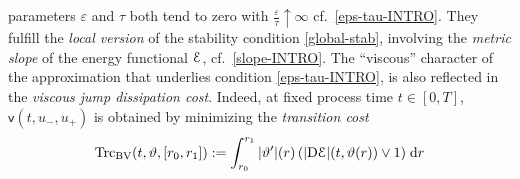 \documentclass[a4paper,10pt,reqno]{amsart} %
\numberwithin{equation}{section}
\newcommand{\up}{\uparrow}
\newcommand{\down}{\downarrow}
\def\rmD{{\mathrm D}} \def\rmE{{\mathrm E}} \def\rmF{{\mathrm F}}
\def\dd{\;\!\mathrm{d}} %
\newcommand{\eps}{\varepsilon}
\newcommand{\teta}{\vartheta}
\newcommand{\Xs}{X}
\newcommand{\BV}{\mathrm{BV}}
\newcommand{\mdn}{\mathsf{d}}
\newcommand{\md}[2]{\mathsf{d}(#1,#2)}
\newcommand{\ene}[2]{\mathcal{E}(#1,#2)}
\newcommand{\corr}[2]{\delta(#1,#2)}
\newcommand{\bvcost}[3]{\mathsf{v}(#1,#2,#3)}
\newcommand{\RIS}{(\Xs,\calE,\mdn)}
\newcommand{\slope}[3]{|\rmD {#1}|(#2,#3)}
\newcommand{\tcost}[4]{\mathrm{Trc}_{#1}(#2,#3,#4)}
\newcommand{\RRR}{\color{red}}
\newcommand{\EEE}{\color{black}}
\begin{document}
 parameters $\eps$ and $\tau$ both tend to zero with  $\tfrac{\eps}\tau \up \infty$ cf.\ \eqref{eps-tau-INTRO}.
They
 fulfill the \emph{local version} of the stability condition \eqref{global-stab}, involving the \emph{metric slope} of the energy functional ${\mathcal E}$, cf.\  \eqref{slope-INTRO}.
The ``viscous'' character  of the approximation that underlies condition
\eqref{eps-tau-INTRO},
is also reflected in the \emph{viscous jump dissipation cost}. Indeed, at fixed process time $t\in [0,T]$,  $ \bvcost t{u_-}{u_+}$  is 
obtained by minimizing the \emph{transition cost}
\begin{equation}
\label{bv-trans-cost}
\tcost{\BV}{t}{\teta}{[r_0,r_1]}: = \int_{r_0}^{r_1}
|\teta'|(r) \left( \slope \calE t{\teta(r)} \vee 1 \right)  \dd r 
\end{equation}
\end{document}
